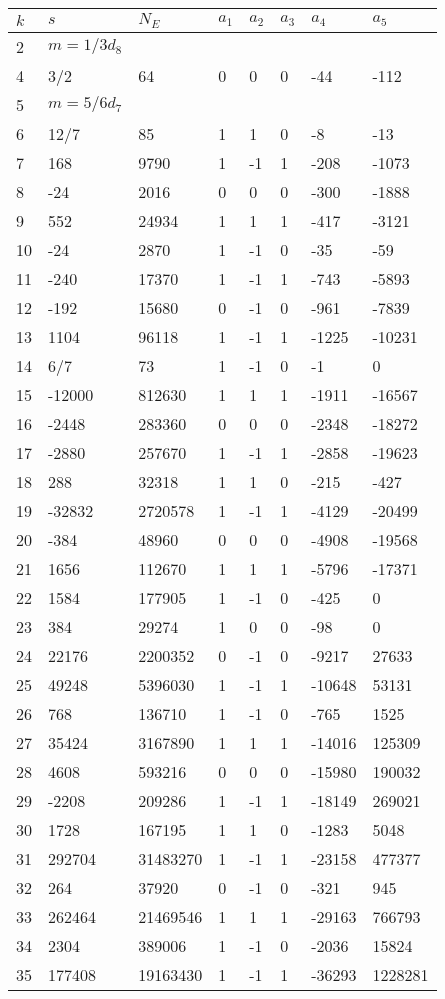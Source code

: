 \documentclass{amsart}
\begin{document}
\begin{longtable}{|l|l|l|lllll|}
\hline
$k$ & $s$ & $N_E$ & $a_1$ & $a_2$ & $a_3$ & $a_4$ & $a_5$\\
\hline
2&$m=1/3d_{8}$&&\multicolumn{5}{c|}{}\\
4&3/2&64&0&0&0&-44&-112\\
5&$m=5/6d_{7}$&&\multicolumn{5}{c|}{}\\
6&12/7&85&1&1&0&-8&-13\\
7&168&9790&1&-1&1&-208&-1073\\
8&-24&2016&0&0&0&-300&-1888\\
9&552&24934&1&1&1&-417&-3121\\
10&-24&2870&1&-1&0&-35&-59\\
11&-240&17370&1&-1&1&-743&-5893\\
12&-192&15680&0&-1&0&-961&-7839\\
13&1104&96118&1&-1&1&-1225&-10231\\
14&6/7&73&1&-1&0&-1&0\\
15&-12000&812630&1&1&1&-1911&-16567\\
16&-2448&283360&0&0&0&-2348&-18272\\
17&-2880&257670&1&-1&1&-2858&-19623\\
18&288&32318&1&1&0&-215&-427\\
19&-32832&2720578&1&-1&1&-4129&-20499\\
20&-384&48960&0&0&0&-4908&-19568\\
21&1656&112670&1&1&1&-5796&-17371\\
22&1584&177905&1&-1&0&-425&0\\
23&384&29274&1&0&0&-98&0\\
24&22176&2200352&0&-1&0&-9217&27633\\
25&49248&5396030&1&-1&1&-10648&53131\\
26&768&136710&1&-1&0&-765&1525\\
27&35424&3167890&1&1&1&-14016&125309\\
28&4608&593216&0&0&0&-15980&190032\\
29&-2208&209286&1&-1&1&-18149&269021\\
30&1728&167195&1&1&0&-1283&5048\\
31&292704&31483270&1&-1&1&-23158&477377\\
32&264&37920&0&-1&0&-321&945\\
33&262464&21469546&1&1&1&-29163&766793\\
34&2304&389006&1&-1&0&-2036&15824\\
35&177408&19163430&1&-1&1&-36293&1228281\\

\end{longtable}
\end{document}
